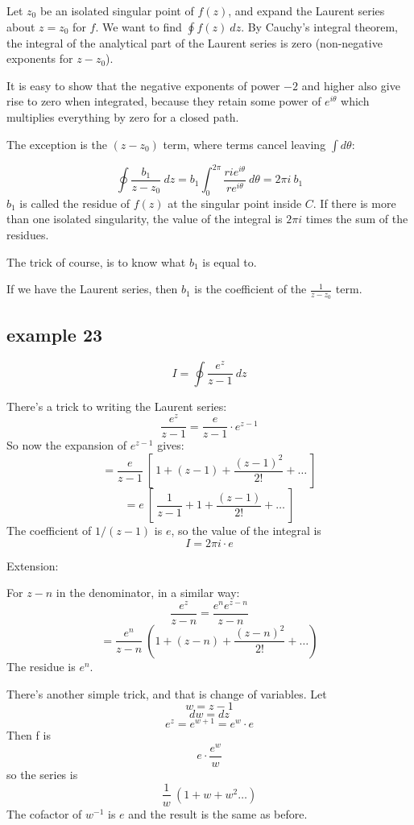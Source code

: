 \documentclass[11pt, oneside]{article}
\begin{document}
Let $z_0$ be an isolated singular point of $f(z)$, and expand the Laurent series about $z = z_0$ for $f$.  We want to find $\oint f(z) \ dz$.  By Cauchy's integral theorem, the integral of the analytical part of the Laurent series is zero (non-negative exponents for $z - z_0$).

It is easy to show that the negative exponents of power $-2$ and higher also give rise to zero when integrated, because they retain some power of $e^{i \theta}$ which multiplies everything by zero for a closed path.

The exception is the $(z-z_0)$ term, where terms cancel leaving $\int d \theta$:

\[ \oint \frac{b_1}{z - z_0} \ dz = b_1 \int_0^{2 \pi} \frac{ri e^{i \theta}}{r e^{i \theta}} \ d \theta = 2 \pi i \ b_1 \]
$b_1$ is called the residue of $f(z)$ at the singular point inside $C$.  If there is more than one isolated singularity, the value of the integral is $2 \pi i$ times the sum of the residues.

The trick of course, is to know what $b_1$ is equal to.

If we have the Laurent series, then $b_1$ is the coefficient of the $\frac{1}{z - z_0}$ term.

\subsection*{example 23}

\label{sec:ex23L}

\[ I = \oint \frac{e^z}{z - 1} \ dz \]

There's a trick to writing the Laurent series:
\[ \frac{e^z}{z - 1} = \frac{e}{z - 1} \cdot e^{z - 1} \]
So now the expansion of $e^{z -1}$ gives:
\[ = \frac{e}{z - 1} \ [ \ 1 + (z - 1) + \frac{(z-1)^2}{2!} + \dots \ ]  \]
\[ = e \ [ \ \frac{1}{z - 1} + 1 + \frac{(z-1)}{2!} + \dots \ ]  \]
The coefficient of $1/(z-1)$ is $e$, so the value of the integral is
\[ I = 2 \pi i \cdot e \]

Extension:

For $z - n$ in the denominator, in a similar way:
\[ \frac{e^z}{z - n} = \frac{e^n e^{z -n}}{z - n} \]
\[ = \frac{e^n}{z - n} \ ( 1 + (z - n) + \frac{(z - n)^2}{2!} + \dots ) \]
The residue is $e^n$.

There's another simple trick, and that is change of variables.  Let
\[ w = z - 1\]
\[ dw = dz \]
\[ e^z = e^{w + 1} = e^w \cdot e \]
Then f is
\[ e \cdot \frac{e^w}{w} \]
so the series is 
\[ \frac{1}{w} \ (1 + w + w^2 \dots ) \]
The cofactor of $w^{-1}$ is $e$ and the result is the same as before.
\end{document}
